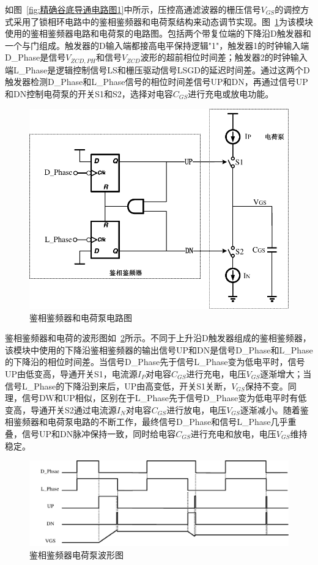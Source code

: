 如图~\ref{fig:精确谷底导通电路图1}中所示，压控高通滤波器的栅压信号$V_{GS}$的调控方式采用了锁相环电路中的鉴相鉴频器和电荷泵结构来动态调节实现。图~\ref{fig:鉴相鉴频器电路图}为该模块使用的鉴相鉴频器电路和电荷泵的电路图。包括两个带复位端的下降沿D触发器和一个与门组成。触发器的D输入端都接高电平保持逻辑"1"，触发器1的时钟输入端D\_Phase是信号$V_{ZCD,PH}$和信号$V_{ZCD}$波形的超前相位时间差；触发器2的时钟输入端L\_Phase是逻辑控制信号LS和栅压驱动信号LSGD的延迟时间差。通过这两个D触发器检测D\_Phase和L\_Phase信号的相位时间差信号UP和DN，再通过信号UP和DN控制电荷泵的开关S1和S2，选择对电容$C_{GS}$进行充电或放电功能。

\begin{figure}[htbp] 
    \centering
    \includegraphics[width=0.6\linewidth]{figures/鉴相鉴频器.pdf}
    \caption{鉴相鉴频器和电荷泵电路图}
    \label{fig:鉴相鉴频器电路图}
\end{figure}

鉴相鉴频器和电荷的波形图如~\ref{fig:鉴相鉴频器波形图}所示。不同于上升沿D触发器组成的鉴相鉴频器，该模块中使用的下降沿鉴相鉴频器的输出信号UP和DN是信号D\_Phase和L\_Phase的下降沿的相位时间差。当信号D\_Phase先于信号L\_Phase变为低电平时，信号UP由低变高，导通开关S1，电流源$I_P$对电容$C_{GS}$进行充电，电压$V_{GS}$逐渐增大；当信号L\_Phase的下降沿到来后，UP由高变低，开关S1关断，$V_{GS}$保持不变。同理，信号DW和UP相似，区别在于L\_Phase先于信号D\_Phase变为低电平时有低变高，导通开关S2通过电流源$I_N$对电容$C_{GS}$进行放电，电压$V_{GS}$逐渐减小。随着鉴相鉴频器和电荷泵电路的不断工作，最终信号D\_Phase和信号L\_Phase几乎重叠，信号UP和DN脉冲保持一致，同时给电容$C_{GS}$进行充电和放电，电压$V_{GS}$维持稳定。

\begin{figure}[htbp] 
    \centering
    \includegraphics[width=0.8\linewidth]{figures/鉴相鉴频器波形图.pdf}
    \caption{鉴相鉴频器电荷泵波形图}
    \label{fig:鉴相鉴频器波形图}
\end{figure}

